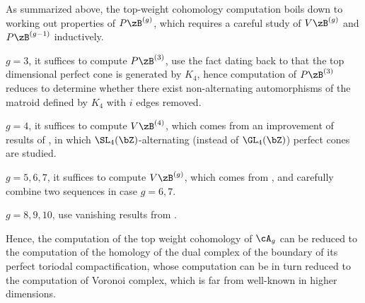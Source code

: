 \documentclass[a4paper, twoside]{article}
\begin{document}

As summarized above, the top-weight cohomology computation boils down to working out properties of $P\zB^{(g)}$, which requires a careful study of $V\zB^{(g)}$ and $P\zB^{(g-1)}$ inductively.

\begin{itm}
	\item $g=3$, it suffices to compute $P\zB^{(3)}$, use the fact dating back to \cite{Voronoi1908} that the top dimensional perfect cone is generated by $K_{4}$, hence computation of $P\zB^{(3)}$ reduces to determine whether there exist non-alternating automorphisms of the matroid defined by $K_{4}$ with $i$ edges removed.
	\item $g=4$, it suffices to compute $V\zB^{(4)}$, which comes from an improvement of results of \cite{LS1978}, in which $\SL_{4}(\bZ)$-alternating (instead of $\GL_{4}(\bZ)$) perfect cones are studied.
	\item $g=5,6,7$, it suffices to compute $V\zB^{(g)}$, which comes from \cite[Theorem~4.3]{EVGS2013}, and carefully combine two sequences in case $g=6,7$.
	\item $g=8,9,10$, use vanishing results from \cite[Theorem~4.5]{SEVKM2019}.
\end{itm}

	Hence, the computation of the top weight cohomology of $\cA_{g}$ can be reduced to the computation of the homology of the dual complex of the boundary of its perfect toriodal compactification, whose computation can be in turn reduced to the computation of Voronoi complex, which is far from well-known in higher dimensions.

\printref
\end{document}
